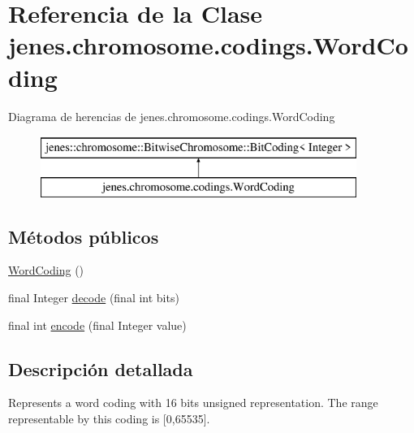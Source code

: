 \hypertarget{classjenes_1_1chromosome_1_1codings_1_1_word_coding}{\section{Referencia de la Clase jenes.\-chromosome.\-codings.\-Word\-Coding}
\label{classjenes_1_1chromosome_1_1codings_1_1_word_coding}
}
Diagrama de herencias de jenes.\-chromosome.\-codings.\-Word\-Coding\begin{figure}[H]
\begin{center}
\leavevmode
\includegraphics[height=2.000000cm]{classjenes_1_1chromosome_1_1codings_1_1_word_coding}
\end{center}
\end{figure}
\subsection*{Métodos públicos}
\begin{DoxyCompactItemize}
\item 
\hyperlink{classjenes_1_1chromosome_1_1codings_1_1_word_coding_ad9cfa1bcd3dff5005c5fcbd3878777f5}{Word\-Coding} ()
\item 
final Integer \hyperlink{classjenes_1_1chromosome_1_1codings_1_1_word_coding_af92b18ee4d82fabeeadf6bb31a61bee6}{decode} (final int bits)
\item 
final int \hyperlink{classjenes_1_1chromosome_1_1codings_1_1_word_coding_a867ca05daba5c08785ec92abc93c586d}{encode} (final Integer value)
\end{DoxyCompactItemize}


\subsection{Descripción detallada}
Represents a word coding with 16 bits unsigned representation. The range representable by this coding is \mbox{[}0,65535\mbox{]}.

